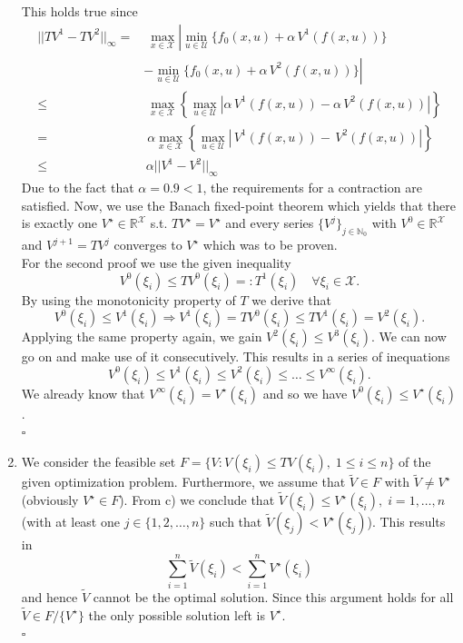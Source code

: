 \documentclass[12pt,pdftex,a4paper]{scrartcl}
\newcommand{\set}[1]{\mathbb{#1}}
\begin{document}
\begin{enumerate}
	\newpage
	This holds true since
	\begin{align*}
		||TV^1 - TV^2||_\infty = & \;\max_{x\in\mathcal{X}}\left| \min_{u\in\mathcal{U}}\{ f_0(x,u) + \alpha\,V^1(f(x,u))\} \right. \\
		& \left. - \min_{u\in\mathcal{U}}\{ f_0(x,u) + \alpha\,V^2(f(x,u))\}\right| \\
		\le & \;\max_{x\in\mathcal{X}}\left\{ \max_{u\in\mathcal{U}} | \alpha\,V^1(f(x,u)) - \alpha\,V^2(f(x,u)) | \right\} \\
		= & \;\alpha \max_{x\in\mathcal{X}}\left\{ \max_{u\in\mathcal{U}} | \,V^1(f(x,u)) -\,V^2(f(x,u)) | \right\} \\
		\le & \,\alpha ||V^1 - V^2||_\infty
	\end{align*}
	Due to the fact that $\alpha = 0.9 < 1$, the requirements for a contraction are satisfied. Now, we use the Banach fixed-point theorem which yields that there is exactly one $V^\star \in \set{R}^\mathcal{X}$ s.t. $TV^\star = V^\star$ and every series $\{V^j\}_{j\in \set{N}_0}$ with $V^0 \in \set{R}^\mathcal{X}$ and $V^{j+1} = TV^j$ converges to $V^\star$ which was to be proven.\\
	For the second proof we use the given inequality
	\begin{equation*}
		V^0(\xi_i) \le TV^0(\xi_i) =: T^1(\xi_i) \quad \forall\xi_i\in\mathcal{X}.
	\end{equation*}
	By using the monotonicity property of $T$ we derive that
	\begin{equation*}
		V^0(\xi_i) \le V^1(\xi_i) \Rightarrow V^1(\xi_i) = TV^0(\xi_i) \le TV^1(\xi_i) = V^2(\xi_i).
	\end{equation*}
	Applying the same property again, we gain $V^2(\xi_i) \le V^3(\xi_i)$. We can now go on and make use of it consecutively. This results in a series of inequations
	\begin{equation*}
		V^0(\xi_i) \le V^1(\xi_i) \le V^2(\xi_i) \le \ldots \le V^\infty(\xi_i).
	\end{equation*}
	We already know that $V^\infty(\xi_i) = V^\star(\xi_i)$ and so we have $V^0(\xi_i) \le V^\star(\xi_i)$.\\
	\hspace*{133mm}$\square$
	
	\item We consider the feasible set $F = \{V : V(\xi_i) \le TV(\xi_i), \; 1\le i \le n\}$ of the given optimization problem. Furthermore, we assume that $\tilde{V}\in F$ with $\tilde{V} \neq V^\star$ (obviously $V^\star \in F$). From c) we conclude that $\tilde{V}(\xi_i) \le V^\star(\xi_i), \; i = 1,\ldots, n$ (with at least one $j\in\{1,2,\ldots ,n\}$ such that $\tilde{V}(\xi_j) < V^\star(\xi_j)$). This results in
	\begin{equation*}
		\sum_{i=1}^n \tilde{V}(\xi_i) < \sum_{i=1}^n V^\star(\xi_i)
	\end{equation*}
	and hence $\tilde{V}$ cannot be the optimal solution. Since this argument holds for all $\tilde{V} \in F/\{V^\star\}$ the only possible solution left is $V^\star$.\\
	\hspace*{133mm}$\square$
	

\end{enumerate}
\end{document}
